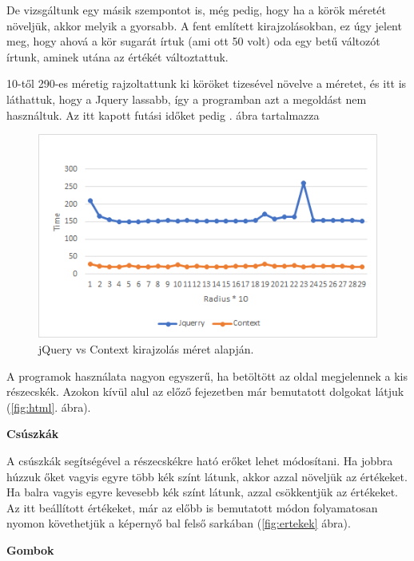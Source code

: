 \medskip

De vizsgáltunk egy másik szempontot is, még pedig, hogy ha a körök méretét növeljük, akkor melyik a gyorsabb. A fent említett kirajzolásokban, ez úgy jelent meg, hogy ahová a kör sugarát írtuk (ami ott 50 volt) oda egy betű változót írtunk, aminek utána az értékét változtattuk.

10-től 290-es méretig rajzoltattunk ki köröket tizesével növelve a méretet, és itt is láthattuk, hogy a Jquery lassabb, így a programban azt a megoldást nem használtuk. Az itt kapott futási időket pedig . ábra tartalmazza


\begin{figure}[h]
	\centering
	\includegraphics[width=\textwidth]{images/radius.png}
	\caption{jQuery vs Context kirajzolás méret alapján.}
	\label{fig:radius}
\end{figure}




A programok használata nagyon egyszerű, ha betöltött az oldal megjelennek a kis részecskék. Azokon kívül alul az előző fejezetben már bemutatott dolgokat látjuk (\ref{fig:html}. ábra). 

\textbf{Csúszkák}

A csúszkák segítségével a részecskékre ható erőket lehet módosítani. Ha jobbra húzzuk őket vagyis egyre több kék színt látunk, akkor azzal növeljük az értékeket. Ha balra vagyis egyre kevesebb kék színt látunk, azzal csökkentjük az értékeket. Az itt beállított értékeket, már az előbb is bemutatott módon folyamatosan nyomon követhetjük a képernyő bal felső sarkában (\ref{fig:ertekek} ábra). 


\textbf{Gombok}

